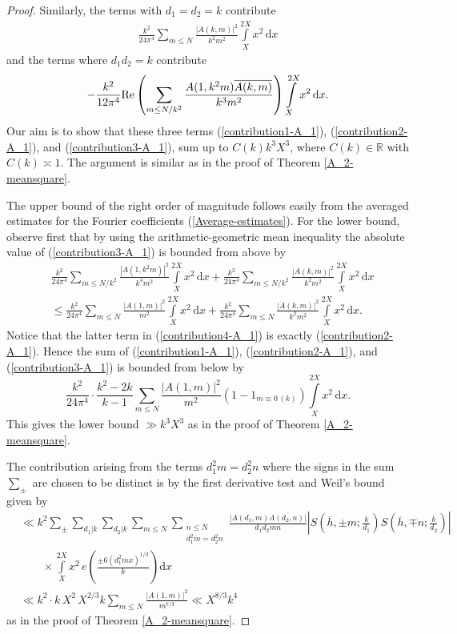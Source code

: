 \documentclass[a4paper,10pt,twoside]{amsart}
\theoremstyle{definition}
\numberwithin{equation}{section}
\renewcommand{\Re}{\textnormal{Re}}
\renewcommand\d{\textnormal{ d}}
\renewcommand\:{\colon}
\begin{document}
\begin{proof}
Similarly, the terms with $d_1=d_2=k$ contribute
\begin{align}\label{contribution2-A_1}
\frac{k^2}{24\pi^4}\sum_{m\leq N}\frac{\left|A(k,m)\right|^2}{k^{2}m^{2}}\int\limits_X^{2X}x^{2}\,\mathrm d x
\end{align}
and the terms where $d_1d_2=k$ contribute
\begin{align}\label{contribution3-A_1}
-\frac{k^2}{12\pi^4}\Re\left(\sum_{m\leq N/k^2}\frac{A(1,k^2m)\overline{A(k,m)}}{k^{3}m^{2}}\right)\int\limits_X^{2X}x^{2}\,\mathrm d x. 
\end{align}
Our aim is to show that these three terms (\ref{contribution1-A_1}), (\ref{contribution2-A_1}), and (\ref{contribution3-A_1}), sum up to $C(k)k^3X^{3}$, where $C(k)\in\mathbb R$ with $C(k)\asymp 1$. The argument is similar as in the proof of Theorem \ref{A_2-meansquare}.

The upper bound of the right order of magnitude follows easily from the averaged estimates for the Fourier coefficients (\ref{Average-estimates}). For the lower bound, observe first that by using the arithmetic-geometric mean inequality the absolute value of (\ref{contribution3-A_1}) is bounded from above by
\begin{align}\label{contribution4-A_1}
&\frac{k^2}{24\pi^4}\sum_{m\leq N/k^2}\frac{\left|A(1,k^2m)\right|^2}{k^{4}m^{2}}\int\limits_X^{2X}x^{2}\,\mathrm dx+\frac{k^2}{24\pi^4}\sum_{m\leq N/k^2}\frac{\left|A(k,m)\right|^2}{k^{2}m^{2}}\int\limits_X^{2X}x^{2}\,\mathrm d x \nonumber\\
&\leq \frac{k^2}{24\pi^4}\sum_{m\leq N}\frac{\left|A(1,m)\right|^2}{m^{2}}\int\limits_X^{2X}x^{2}\,\mathrm dx+\frac{k^2}{24\pi^4}\sum_{m\leq N}\frac{\left|A(k,m)\right|^2}{k^{2}m^{2}}\int\limits_X^{2X}x^{2}\,\mathrm d x .
\end{align}
Notice that the latter term in (\ref{contribution4-A_1}) is exactly (\ref{contribution2-A_1}). Hence the sum of (\ref{contribution1-A_1}), (\ref{contribution2-A_1}), and (\ref{contribution3-A_1}) is bounded from below by 
\[ 
\frac{k^2}{24\pi^4}\cdot\frac{k^2-2k}{k-1}\sum_{m\leq N}\frac{|A(1,m)|^2}{m^2}\left(1-1_{m\equiv 0\,(k)}\right)\int\limits_X^{2X}x^2\,\mathrm d x.\]
This gives the lower bound $\gg k^3X^3$ as in the proof of Theorem \ref{A_2-meansquare}. 

The contribution arising from the terms $d_1^2m=d_2^2n$ where the signs in the sum $\sum_\pm$ are chosen to be distinct is by the first derivative test and Weil's bound given by
\begin{align*}
&\ll k^2\sum_\pm\sum_{d_1|k}\sum_{d_2|k}\sum_{m\leq N}\sum_{\substack{n\leq N\\d_1^2m=d_2^2n}}\frac{|A(d_1,m)\overline{A(d_2,n)|}}{d_1d_2mn}\left|S\left(\overline h,\pm m;\frac k{d_1}\right)S\left(\overline h,\mp n;\frac k{d_2}\right)\right|\\
&\qquad\times\int\limits_X^{2X}x^{2}\,e\!\left(\frac{\pm 6(d_1^2mx)^{1/3}}k\right)\mathrm dx\\
&\ll k^2\cdot k\,X^{2}\,X^{2/3}k\sum_{m\leq N}\frac{\left|A(1,m)\right|^2}{m^{7/3}}\ll X^{8/3}k^{4}
\end{align*} 
as in the proof of Theorem \ref{A_2-meansquare}. 


\end{proof}
\end{document}
